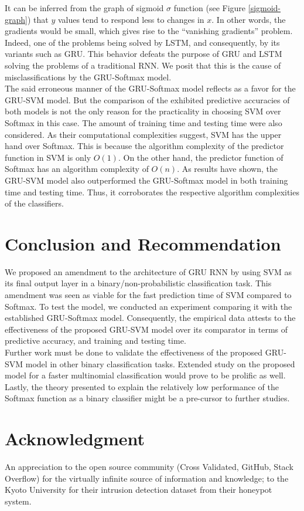 \indent	It can be inferred from the graph of sigmoid $\sigma$ function (see Figure \ref{sigmoid-graph}) that $y$ values tend to respond less to changes in $x$. In other words, the gradients would be small, which gives rise to the ``vanishing gradients'' problem. Indeed, one of the problems being solved by LSTM, and consequently, by its variants such as GRU\cite{Cho, hochreiter1997long}. This behavior defeats the purpose of GRU and LSTM solving the problems of a traditional RNN. We posit that this is the cause of misclassifications by the GRU-Softmax model.\\
\indent	The said erroneous manner of the GRU-Softmax model reflects as a favor for the GRU-SVM model. But the comparison of the exhibited predictive accuracies of both models is not the only reason for the practicality in choosing SVM over Softmax in this case. The amount of training time and testing time were also considered. As their computational complexities suggest, SVM has the upper hand over Softmax. This is because the algorithm complexity of the predictor function in SVM is only $O(1)$. On the other hand, the predictor function of Softmax has an algorithm complexity of $O(n)$. As results have shown, the GRU-SVM model also outperformed the GRU-Softmax model in both training time and testing time. Thus, it corroborates the respective algorithm complexities of the classifiers.\\

\section{Conclusion and Recommendation}

We proposed an amendment to the architecture of GRU RNN by using SVM as its final output layer in a binary/non-probabilistic classification task. This amendment was seen as viable for the fast prediction time of SVM compared to Softmax. To test the model, we conducted an experiment comparing it with the established GRU-Softmax model. Consequently, the empirical data attests to the effectiveness of the proposed GRU-SVM model over its comparator in terms of predictive accuracy, and training and testing time.\\
\indent	Further work must be done to validate the effectiveness of the proposed GRU-SVM model in other binary classification tasks. Extended study on the proposed model for a faster multinomial classification would prove to be prolific as well. Lastly, the theory presented to explain the relatively low performance of the Softmax function as a binary classifier might be a pre-cursor to further studies.

\section{Acknowledgment}
An appreciation to the open source community (Cross Validated, GitHub, Stack Overflow) for the virtually infinite source of information and knowledge; to the Kyoto University for their intrusion detection dataset from their honeypot system.